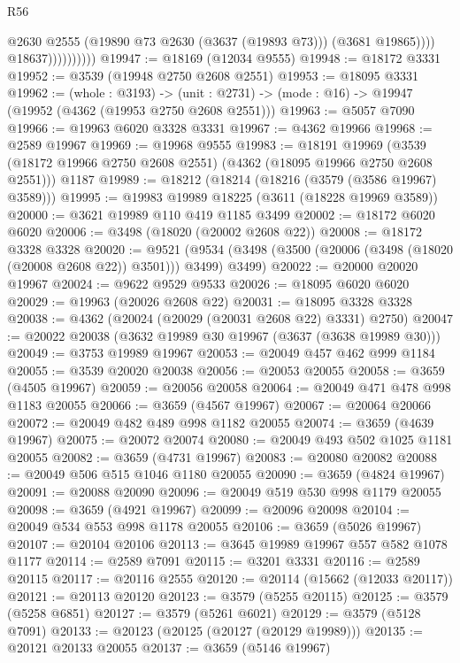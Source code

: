 \begin{lexlean}{R56}
\begin{coremodule}
                              @2630
                              @2555
                              (@19890 @73 @2630 (@3637 (@19893 @73)))
                              (@3681 @19865))))
                        @18637))))))))))
@19947 := @18169 (@12034 @9555)
@19948 := @18172 @3331
@19952 := @3539 (@19948 @2750 @2608 @2551)
@19953 := @18095 @3331
@19962 := (whole : @3193) ->
  (unit : @2731) -> (mode : @16) -> @19947 (@19952 (@4362 (@19953 @2750 @2608 @2551)))
@19963 := @5057 @7090
@19966 := @19963 @6020 @3328 @3331
@19967 := @4362 @19966
@19968 := @2589 @19967
@19969 := @19968 @9555
@19983 := @18191
    @19969
    (@3539 (@18172 @19966 @2750 @2608 @2551) (@4362 (@18095 @19966 @2750 @2608 @2551)))
    @1187
@19989 := @18212 (@18214 (@18216 (@3579 (@3586 @19967) @3589)))
@19995 := @19983 @19989 @18225 (@3611 (@18228 @19969 @3589))
@20000 := @3621 @19989 @110 @419 @1185 @3499
@20002 := @18172 @6020 @6020
@20006 := @3498 (@18020 (@20002 @2608 @22))
@20008 := @18172 @3328 @3328
@20020 := @9521
    (@9534 (@3498 (@3500 (@20006 (@3498 (@18020 (@20008 @2608 @22)) @3501))) @3499) @3499)
@20022 := @20000 @20020 @19967
@20024 := @9622 @9529 @9533
@20026 := @18095 @6020 @6020
@20029 := @19963 (@20026 @2608 @22)
@20031 := @18095 @3328 @3328
@20038 := @4362 (@20024 (@20029 (@20031 @2608 @22) @3331) @2750)
@20047 := @20022 @20038 (@3632 @19989 @30 @19967 (@3637 (@3638 @19989 @30)))
@20049 := @3753 @19989 @19967
@20053 := @20049 @457 @462 @999 @1184
@20055 := @3539 @20020 @20038
@20056 := @20053 @20055
@20058 := @3659 (@4505 @19967)
@20059 := @20056 @20058
@20064 := @20049 @471 @478 @998 @1183 @20055
@20066 := @3659 (@4567 @19967)
@20067 := @20064 @20066
@20072 := @20049 @482 @489 @998 @1182 @20055
@20074 := @3659 (@4639 @19967)
@20075 := @20072 @20074
@20080 := @20049 @493 @502 @1025 @1181 @20055
@20082 := @3659 (@4731 @19967)
@20083 := @20080 @20082
@20088 := @20049 @506 @515 @1046 @1180 @20055
@20090 := @3659 (@4824 @19967)
@20091 := @20088 @20090
@20096 := @20049 @519 @530 @998 @1179 @20055
@20098 := @3659 (@4921 @19967)
@20099 := @20096 @20098
@20104 := @20049 @534 @553 @998 @1178 @20055
@20106 := @3659 (@5026 @19967)
@20107 := @20104 @20106
@20113 := @3645 @19989 @19967 @557 @582 @1078 @1177
@20114 := @2589 @7091
@20115 := @3201 @3331
@20116 := @2589 @20115
@20117 := @20116 @2555
@20120 := @20114 (@15662 (@12033 @20117))
@20121 := @20113 @20120
@20123 := @3579 (@5255 @20115)
@20125 := @3579 (@5258 @6851)
@20127 := @3579 (@5261 @6021)
@20129 := @3579 (@5128 @7091)
@20133 := @20123 (@20125 (@20127 (@20129 @19989)))
@20135 := @20121 @20133 @20055
@20137 := @3659 (@5146 @19967)

\end{coremodule}
\end{lexlean}
